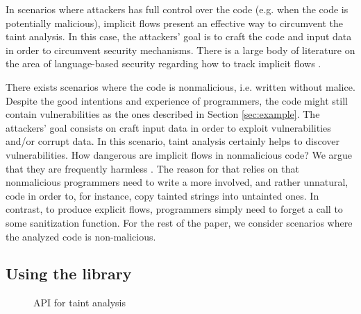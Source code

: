 \documentclass[oribibl]{llncs}
\begin{document}

In scenarios where attackers has full control over the code 
(e.g. when the code is potentially malicious), implicit flows present
an effective way to circumvent the taint
analysis. In this case, the attackers' goal  is to craft the code and input 
data in order to circumvent security mechanisms. There is a large body
of literature on the area of language-based security regarding 
how to track implicit flows \cite{Sabelfeld:Myers:JSAC}. 


There exists scenarios where 
the code is nonmalicious, i.e. written without malice. 
Despite the good intentions and experience of programmers, 
the code might still contain vulnerabilities 
as the ones
described in Section \ref{sec:example}. The attackers' goal  
consists on craft input data in order to exploit 
vulnerabilities and/or corrupt data. In this scenario,
taint analysis certainly helps to discover vulnerabilities. 
How dangerous are implicit flows in nonmalicious code? We argue that they
are frequently harmless \cite{Russo:IOS}. The reason for that 
relies on that nonmalicious programmers
need to write a more involved, and rather unnatural,
code in order to, for instance, copy tainted strings into untainted ones. 
In contrast, to produce explicit flows, programmers simply
need to forget a call to some sanitization function. 
For the rest of the paper, we consider 
scenarios where the analyzed code is non-malicious. 



\subsection{Using the library}
\label{sec:using}
\begin{figure}[t]
{\small{
\begin{minipage}[t]{0.5\linewidth}
 
\end{minipage}
\hspace{40pt}
\begin{minipage}[t]{0.5\linewidth}
 
\end{minipage}
\caption{\label{fig:API}API for taint analysis}
}}
\end{figure}
\end{document}
